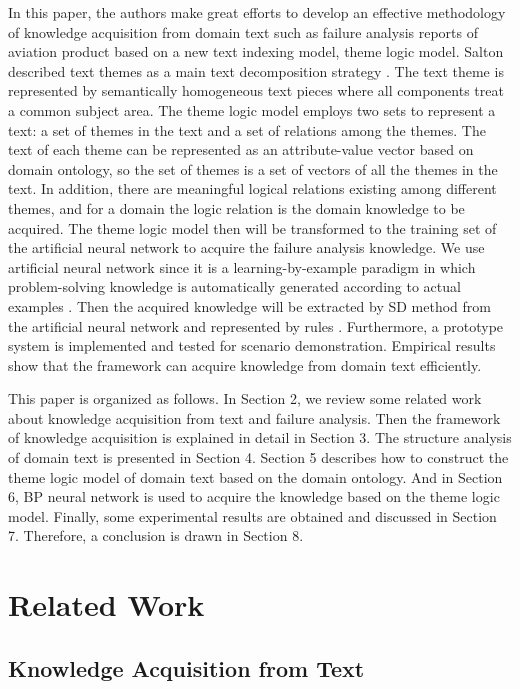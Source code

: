 \documentclass{elsarticle}
\begin{document}
In this paper, the authors make great efforts to develop an effective methodology of
knowledge acquisition from domain text such as failure analysis
reports of aviation product based on a new text indexing model, theme
logic model. Salton described text themes as a main text decomposition
strategy \cite{234834}. The text theme is represented by semantically
homogeneous text pieces where all components treat a common subject
area. The theme logic model employs two sets to represent a text: a
set of themes in the text and a set of relations among the themes. The
text of each theme can be represented as an attribute-value vector
based on domain ontology, so the set of themes is a set of vectors of
all the themes in the text. In addition, there are meaningful logical
relations existing among different themes, and for a domain the logic
relation is the domain knowledge to be acquired. The theme logic model
then will be transformed to the training set of the artificial neural
network to acquire the failure analysis knowledge. We use  artificial
neural network since it is a learning-by-example paradigm in which
problem-solving knowledge is automatically generated according to
actual examples \cite{Huang2002,Kim2004}. Then the acquired knowledge  will be extracted by SD method from the artificial neural network and represented by rules \cite{130346,Sestito1991}. Furthermore, a prototype system is implemented and tested for scenario demonstration. Empirical results show that the framework can acquire knowledge from domain text efficiently.

This paper is organized as follows. In Section 2, we review some related work about knowledge acquisition from text and failure analysis. Then the framework of knowledge acquisition is explained in detail in Section 3. The structure analysis of domain text is presented in Section 4. Section 5 describes how to construct the theme logic model of domain text based on the domain ontology. And in Section 6, BP neural network is used to acquire the knowledge based on the theme logic model. Finally,  some experimental results are obtained and discussed in Section 7. Therefore, a conclusion is drawn in Section 8. 

\section{Related Work
}
\label{sec:related-work}

\subsection{Knowledge Acquisition from Text
}
\label{sec:knowl-acqu-from}
\end{document}
